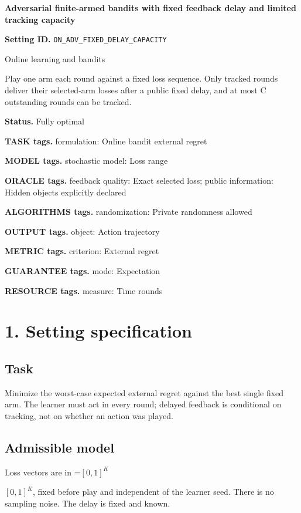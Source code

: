 \documentclass[10pt,a4paper]{article}
\newcommand{\AtlasMath}[1]{\par\begingroup\centering\setbox0=\hbox{$\displaystyle #1$}\ifdim\wd0>1.4\linewidth\typeout{ATLAS WIDE FORMULA: \the\wd0}\fi\ifdim\wd0>\linewidth\resizebox{\linewidth}{!}{\box0}\else\box0\fi\par\endgroup}
\newcommand{\AtlasInlineMath}[1]{\begingroup\setbox0=\hbox{$#1$}\ifdim\wd0>.4\linewidth\endgroup\AtlasMath{#1}\else\endgroup$#1$\fi}
\begin{document}
\raggedright

{\LARGE\bfseries\sffamily\color{AtlasNavy} Adversarial finite-armed bandits with fixed feedback delay and limited tracking capacity\par}\vspace{5pt}
\textbf{Setting ID.} \texttt{ON\_\allowbreak{}ADV\_\allowbreak{}FIXED\_\allowbreak{}DELAY\_\allowbreak{}CAPACITY}

Online learning and bandits

Play one arm each round against a fixed loss sequence. Only tracked rounds deliver their selected-arm losses after a public fixed delay, and at most C outstanding rounds can be tracked.

\textbf{Status.} Fully optimal

\textbf{TASK tags.} formulation: Online bandit external regret

\textbf{MODEL tags.} stochastic model: Loss range

\textbf{ORACLE tags.} feedback quality: Exact selected loss; public information: Hidden objects explicitly declared

\textbf{ALGORITHMS tags.} randomization: Private randomness allowed

\textbf{OUTPUT tags.} object: Action trajectory

\textbf{METRIC tags.} criterion: External regret

\textbf{GUARANTEE tags.} mode: Expectation

\textbf{RESOURCE tags.} measure: Time rounds

\section{1. Setting specification}
\subsection{Task}
Minimize the worst-case expected external regret against the best single fixed arm. The learner must act in every round; delayed feedback is conditional on tracking, not on whether an action was played.

\subsection{Admissible model}
Loss vectors are in \AtlasInlineMath{[0,1]^K}, fixed before play and independent of the learner seed. There is no sampling noise. The delay is fixed and known.
\end{document}
